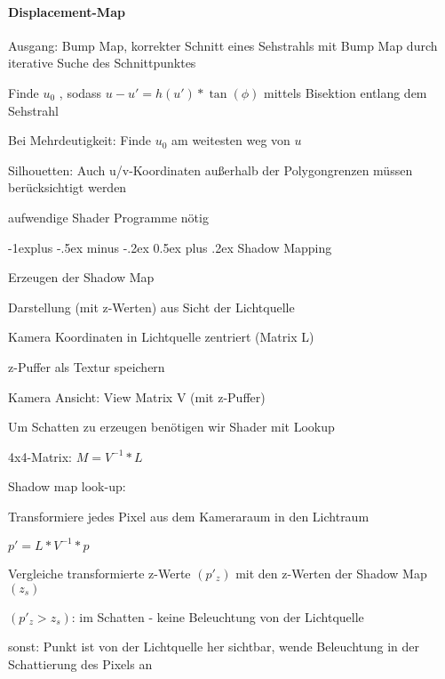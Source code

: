 \documentclass[landscape]{article}
\makeatletter
\renewcommand{\subsection}{\@startsection{subsection}{2}{0mm}%
                                {-1explus -.5ex minus -.2ex}%
                                {0.5ex plus .2ex}%
                                {\normalfont\normalsize\bfseries}}
\makeatother
\begin{document}
\begin{multicols}{3}
  \paragraph{Displacement-Map}
  \begin{itemize*}
    \item Ausgang: Bump Map, korrekter Schnitt eines Sehstrahls mit Bump Map durch iterative Suche des Schnittpunktes
    \item Finde $u_0$ , sodass $u-u' = h(u') * \tan(\phi)$ mittels Bisektion entlang dem Sehstrahl
    \item Bei Mehrdeutigkeit: Finde $u_0$ am weitesten weg von $u$
    \item Silhouetten: Auch u/v-Koordinaten außerhalb der Polygongrenzen müssen berücksichtigt werden
    \item aufwendige Shader Programme nötig
  \end{itemize*}
  
  \subsection{Shadow Mapping}
    \begin{itemize*} 
      \item Erzeugen der Shadow Map
      \item Darstellung (mit z-Werten) aus Sicht der Lichtquelle
      \item Kamera Koordinaten in Lichtquelle zentriert (Matrix L)
      \item z-Puffer als Textur speichern
      \item Kamera Ansicht: View Matrix V (mit z-Puffer)
      \item Um Schatten zu erzeugen benötigen wir Shader mit Lookup
      \item 4x4-Matrix: $M = V^{-1}*L$
    \end{itemize*}
  
  Shadow map look-up:
  \begin{itemize*}
    \item Transformiere jedes Pixel aus dem Kameraraum in den Lichtraum
    \item $p'=L*V^{-1}*p$
    \item Vergleiche transformierte z-Werte $(p'_z)$ mit den z-Werten der Shadow Map $(z_s)$
    \item $(p'_z>z_s)$: im Schatten - keine Beleuchtung von der Lichtquelle
    \item sonst: Punkt ist von der Lichtquelle her sichtbar, wende Beleuchtung in der Schattierung des Pixels an
  \end{itemize*}
  

\end{multicols}
\end{document}
